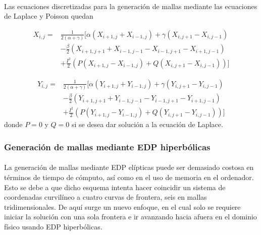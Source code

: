 \documentclass[letterpaper, openright, 12pt]{book}
\begin{document}
    \paragraph*{}
    Las ecuaciones discretizadas para la generación de mallas mediante las
    ecuaciones de Laplace y Poisson quedan

    \begin{align}
        X_{i, j} =& \frac{1}{2 \left(\alpha + \gamma\right)}
        \Biggl[
            \alpha \left(X_{i+1, j} + X_{i-1, j}\right)
            + \gamma \left(X_{i, j+1} - X_{i, j-1}\right)\\
            &- \frac{\beta}{2} \left(X_{i+1, j+1} + X_{i-1, j-1}
                    - X_{i-1, j+1} - X_{i+1, j-1}\right)\\
            &+ \frac{I^2}{2} \left( P \left(X_{i+1, j} - X_{i-1, j}\right)
            + Q \left( X_{i, j+1} - X_{i, j-1} \right)\right)
        \Biggr]
    \end{align}

    \begin{align}
        Y_{i, j} =& \frac{1}{2 \left(\alpha + \gamma\right)}
        \Biggl[
            \alpha \left(Y_{i+1, j} + Y_{i-1, j}\right)
            + \gamma \left(Y_{i, j+1} - Y_{i, j-1}\right)\\
            &- \frac{\beta}{2} \left(Y_{i+1, j+1} + Y_{i-1, j-1}
                    - Y_{i-1, j+1} - Y_{i+1, j-1}\right)\\
            &+ \frac{I^2}{2} \left( P \left(Y_{i+1, j} - Y_{i-1, j}\right)
            + Q \left( Y_{i, j+1} - Y_{i, j-1} \right)\right)
        \Biggr]
    \end{align}
    donde $P=0$ y $Q=0$ si se desea dar solución a la ecuación de Laplace.

    \subsubsection{Generación de mallas mediante EDP hiperbólicas}
    \paragraph*{}
    La generación de mallas mediante EDP elípticas puede ser demasiado
    costosa en términos de tiempo de cómputo, así como en el uso de memoria
    en el ordenador. Esto se debe a que dicho esquema intenta hacer
    coincidir un sistema de coordenadas curvilíneo a cuatro curvas de
    frontera, seis en mallas tridimensionales. De aquí surge un nuevo
    enfoque, en el cual solo se requiere iniciar la solución con una sola
    frontera e ir avanzando hacia afuera en el dominio físico usando EDP
    hiperbólicas. \cite{farrashkhalvat}
\end{document}
